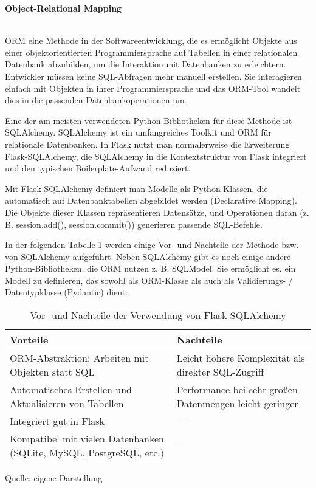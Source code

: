 \textbf{Object-Relational Mapping}

\\

\ac{ORM} eine Methode in der Softwareentwicklung, die es ermöglicht Objekte aus einer objektorientierten Programmiersprache auf
Tabellen in einer relationalen Datenbank abzubilden, um die Interaktion mit Datenbanken zu erleichtern.
Entwickler müssen keine SQL-Abfragen mehr manuell erstellen.
Sie interagieren einfach mit Objekten in ihrer Programmiersprache
und das ORM-Tool wandelt dies in die passenden Datenbankoperationen um. \cite{miguelgrinberg_flask_mega_tutorial_db,flask_official_sqlalchemy_pattern}

Eine der am meisten verwendeten Python-Bibliotheken für diese Methode ist SQLAlchemy.
SQLAlchemy ist ein umfangreiches Toolkit und \ac{ORM} für relationale Datenbanken.
In Flask nutzt man normalerweise die Erweiterung Flask-SQLAlchemy, die SQLAlchemy in die Kontextstruktur von Flask
integriert und den typischen Boilerplate-Aufwand reduziert. \cite*{flask_sqlalchemy_docs}

Mit Flask-SQLAlchemy definiert man Modelle als Python-Klassen, die automatisch auf Datenbanktabellen abgebildet werden (Declarative Mapping).
Die Objekte dieser Klassen repräsentieren Datensätze, und Operationen daran (z. B. session.add(), session.commit()) generieren passende SQL-Befehle.\cite*{flask_sqlalchemy_docs}

In der folgenden Tabelle \ref{tab:sqlalchemy_vor_nachteile} werden einige Vor- und Nachteile der Methode bzw. von SQLAlchemy aufgeführt.
Neben SQLAlchemy gibt es noch einige andere Python-Bibliotheken, die \ac{ORM} nutzen z. B. SQLModel.
Sie ermöglicht es, ein Modell zu definieren, das sowohl als ORM-Klasse als auch als Validierungs- / Datentypklasse (Pydantic) dient\cite*{sqlmodel_docs}.

\begin{table}[H]
    \centering
    \begin{tabular}{|p{}|p{}|}
        \hline
        \textbf{Vorteile} & \textbf{Nachteile} \\
        \hline
        ORM-Abstraktion: Arbeiten mit Objekten statt SQL &
        Leicht höhere Komplexität als direkter SQL-Zugriff \\
        \hline
        Automatisches Erstellen und Aktualisieren von Tabellen &
        Performance bei sehr großen Datenmengen leicht geringer \\
        \hline
        Integriert gut in Flask &
        — \\
        \hline
        Kompatibel mit vielen Datenbanken (SQLite, MySQL, PostgreSQL, etc.) &
        — \\
        \hline
    \end{tabular}
    \caption{Vor- und Nachteile der Verwendung von Flask-SQLAlchemy}
    \label{tab:sqlalchemy_vor_nachteile}
    \vspace{0.2cm}
    {\small Quelle: eigene Darstellung}
\end{table}

